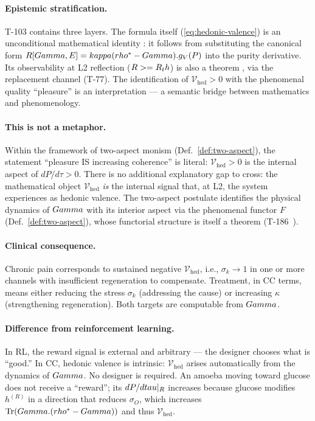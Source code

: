 \paragraph{Epistemic stratification.}
T-103 contains three layers.  The formula itself (\ref{eq:hedonic-valence}) is an
unconditional mathematical identity : it follows from substituting the
canonical form $R[Gamma, E] = kappa(rho^* - Gamma) . g_V(P)$ into the purity
derivative.  Its observability at L2 reflection ($R >= R_th$) is also a theorem ,
via the replacement channel (T-77).  The identification of
$\mathcal{V}_{\mathrm{hed}} > 0$ with the phenomenal quality ``pleasure'' is an
interpretation  --- a semantic bridge between mathematics and phenomenology.

\paragraph{This is not a metaphor.}
Within the framework of two-aspect monism (Def.~\ref{def:two-aspect}), the
statement ``pleasure IS increasing coherence'' is literal: $\mathcal{V}_{\mathrm{hed}}
> 0$ is the internal aspect of $dP/d\tau > 0$. There is no additional
explanatory gap to cross: the mathematical object $\mathcal{V}_{\mathrm{hed}}$
\emph{is} the internal signal that, at L2, the system experiences as hedonic
valence. The two-aspect postulate identifies the physical dynamics of $Gamma$
with its interior aspect via the phenomenal functor $F$
(Def.~\ref{def:two-aspect}), whose functorial structure is itself a theorem
(T-186~).

\paragraph{Clinical consequence.}
Chronic pain corresponds to sustained negative $\mathcal{V}_{\mathrm{hed}}$, i.e.,
$\sigma_k \to 1$ in one or more channels with insufficient regeneration to compensate.
Treatment, in CC terms, means either reducing the stress $\sigma_k$ (addressing the cause)
or increasing $\kappa$ (strengthening regeneration).  Both targets are computable from $Gamma$.

\paragraph{Difference from reinforcement learning.}
In RL, the reward signal is external and arbitrary --- the designer chooses what is
``good.''  In CC, hedonic valence is intrinsic: $\mathcal{V}_{\mathrm{hed}}$ arises
automatically from the dynamics of $Gamma$.  No designer is required.  An amoeba moving
toward glucose does not receive a ``reward''; its $dP/dtau|_{R}$ increases because
glucose modifies $h^{(R)}$ in a direction that reduces $\sigma_O$, which increases
$\Tr(Gamma . (rho^* - Gamma))$ and thus $\mathcal{V}_{\mathrm{hed}}$.

